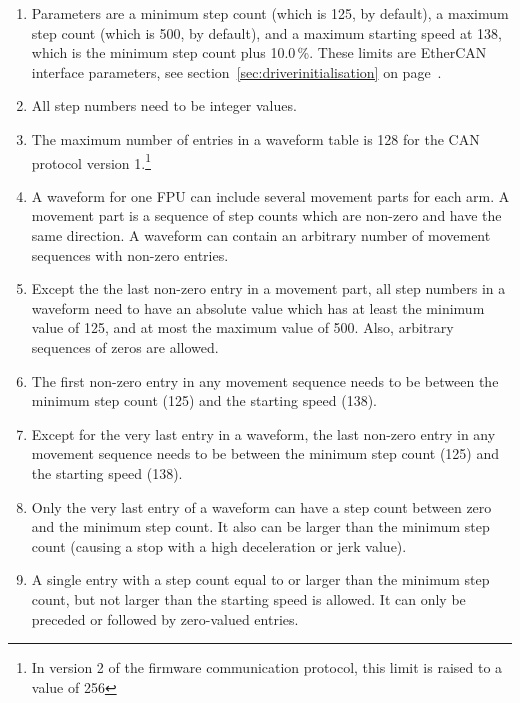 \documentclass[11pt,a4paper]{report}
\begin{document}
\begin{enumerate}
\item Parameters are a minimum step count (which is 125, by default),
  a maximum step count (which is 500, by default), and a maximum
  starting speed at 138, which is the minimum step count plus 10.0\,\%.  These
  limits are EtherCAN interface parameters, see
  section~\ref{sec:driverinitialisation} on
  page~\pageref{sec:driverinitialisation}.


\item All step numbers need to be integer values.

\item The maximum number of entries in a waveform table is 128 for the
  CAN protocol version 1.\footnote{In version 2 of the firmware
    communication protocol, this limit is raised to a value of 256}
  
\item A waveform for one FPU can include several movement parts for
  each arm. A movement part is a sequence of step counts which are
  non-zero and have the same direction.  A waveform can contain an
  arbitrary number of movement sequences with non-zero entries.


\item Except the the last non-zero entry in a movement part, all step
  numbers in a waveform need to have an absolute value which has at
  least the minimum value of 125, and at most the maximum value of
  500. Also, arbitrary sequences of zeros are allowed.
  
\item The first non-zero entry in any movement sequence needs to be
  between the minimum step count (125) and the starting speed (138).
  
\item Except for the very last entry in a waveform, the last non-zero
  entry in any movement sequence needs to be between the minimum step
  count (125) and the starting speed (138).
  
\item Only the very last entry of a waveform can have a step count
  between zero and the minimum step count. It also can be larger than
  the minimum step count (causing a stop with a high deceleration or
  jerk value).
  
\item A single entry with a step count equal to or larger than the
  minimum step count, but not larger than the starting speed is
  allowed. It can only be preceded or followed by zero-valued entries.
  

\end{enumerate}
\end{document}
